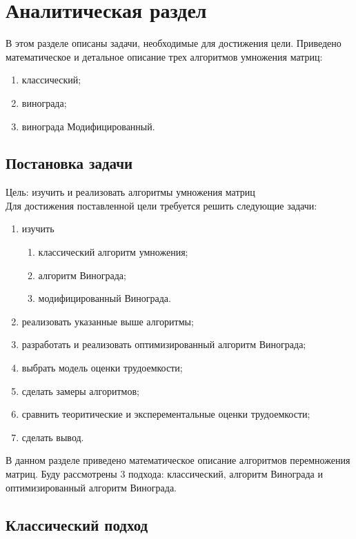 \section{Аналитическая раздел}
	
	В этом разделе описаны задачи, необходимые для достижения цели. Приведено математическое и детальное описание трех алгоритмов умножения матриц:
	
	\begin{enumerate}
		\item классический;
		\item винограда;
		\item винограда Модифицированный.
	\end{enumerate}
	
	\subsection{Постановка задачи}
	
	Цель: изучить и реализовать алгоритмы умножения матриц \\
	
	Для достижения поставленной цели требуется решить следующие задачи: 
	
	\begin{enumerate}
		\item изучить
		\begin{enumerate}
			\item классический алгоритм умножения;
			\item алгоритм Винограда;
			\item модифицированный Винограда.
		\end{enumerate}
		\item реализовать указанные выше алгоритмы;
		\item разработать и реализовать оптимизированный алгоритм Винограда;
		\item выбрать модель оценки трудоемкости;
		\item сделать замеры алгоритмов;
		\item сравнить теоритические и эксперементальные оценки трудоемкости;
		\item сделать вывод.
	\end{enumerate}
		
	В данном разделе приведено математическое описание алгоритмов перемножения матриц. Буду рассмотрены 3 подхода: классический, алгоритм Винограда и оптимизированный алгоритм Винограда.
	
	\subsection{Классический подход}
	
